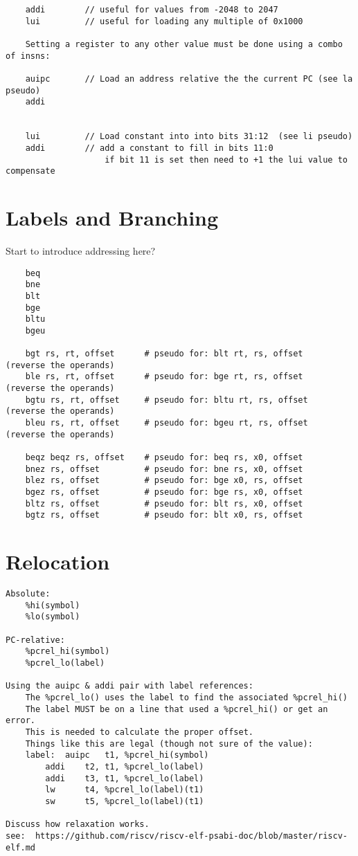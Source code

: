 \begin{verbatim}
    addi        // useful for values from -2048 to 2047
    lui         // useful for loading any multiple of 0x1000

    Setting a register to any other value must be done using a combo of insns:

    auipc       // Load an address relative the the current PC (see la pseudo)
    addi


    lui         // Load constant into into bits 31:12  (see li pseudo)
    addi        // add a constant to fill in bits 11:0
                    if bit 11 is set then need to +1 the lui value to compensate
\end{verbatim}


\section{Labels and Branching}

Start to introduce addressing here?

\begin{verbatim}
    beq
    bne
    blt
    bge
    bltu
    bgeu

    bgt rs, rt, offset      # pseudo for: blt rt, rs, offset    (reverse the operands)
    ble rs, rt, offset      # pseudo for: bge rt, rs, offset    (reverse the operands)
    bgtu rs, rt, offset     # pseudo for: bltu rt, rs, offset   (reverse the operands)
    bleu rs, rt, offset     # pseudo for: bgeu rt, rs, offset   (reverse the operands)

    beqz beqz rs, offset    # pseudo for: beq rs, x0, offset
    bnez rs, offset         # pseudo for: bne rs, x0, offset
    blez rs, offset         # pseudo for: bge x0, rs, offset
    bgez rs, offset         # pseudo for: bge rs, x0, offset
    bltz rs, offset         # pseudo for: blt rs, x0, offset
    bgtz rs, offset         # pseudo for: blt x0, rs, offset
\end{verbatim}


\section{Relocation}

\begin{verbatim}
Absolute:
    %hi(symbol)         
    %lo(symbol)         

PC-relative:
    %pcrel_hi(symbol)   
    %pcrel_lo(label)    

Using the auipc & addi pair with label references:
    The %pcrel_lo() uses the label to find the associated %pcrel_hi()
    The label MUST be on a line that used a %pcrel_hi() or get an error.
    This is needed to calculate the proper offset.
    Things like this are legal (though not sure of the value):
    label:  auipc   t1, %pcrel_hi(symbol)
        addi    t2, t1, %pcrel_lo(label)
        addi    t3, t1, %pcrel_lo(label)
        lw      t4, %pcrel_lo(label)(t1)
        sw      t5, %pcrel_lo(label)(t1)

Discuss how relaxation works.
see:  https://github.com/riscv/riscv-elf-psabi-doc/blob/master/riscv-elf.md
\end{verbatim}


